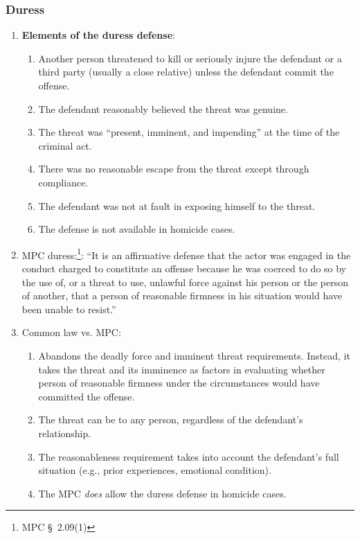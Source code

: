 \subsubsection{Duress}

\begin{enumerate}
    \item \textbf{Elements of the duress defense}:
    \begin{enumerate}
        \item Another person threatened to kill or seriously injure the 
        defendant or a third party (usually a close relative) unless the 
        defendant commit the offense.
        \item The defendant reasonably believed the threat was genuine.
        \item The threat was ``present, imminent, and impending'' at the time 
        of the criminal act.
        \item There was no reasonable escape from the threat except through 
        compliance.
        \item The defendant was not at fault in exposing himself to the 
        threat.
        \item The defense is not available in homicide cases.
    \end{enumerate}
    \item MPC duress:\footnote{MPC \S\ 2.09(1)}: ``It is an affirmative 
    defense that the actor was engaged in the conduct charged to constitute an 
    offense because he was coerced to do so by the use of, or a threat to use, 
    unlawful force against his person or the person of another, that a person 
    of reasonable firmness in his situation would have been unable to 
    resist.''
    \item Common law vs. MPC:
    \begin{enumerate}
        \item Abandons the deadly force and imminent threat requirements. 
        Instead, it takes the threat and its imminence as factors in 
        evaluating whether person of reasonable firmness under the 
        circumstances would have committed the offense.
        \item The threat can be to any person, regardless of the defendant's 
        relationship.
        \item The reasonableness requirement takes into account the 
        defendant's full situation (e.g., prior experiences, emotional 
        condition).
        \item The MPC \emph{does} allow the duress defense in homicide cases.
    \end{enumerate}
\end{enumerate}

